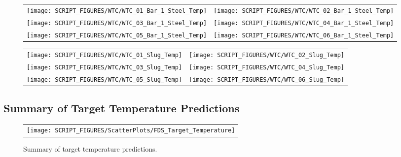 \begin{figure}[p]
\begin{tabular*}{\textwidth}{l@{\extracolsep{\fill}}r}
\texttt{[image: SCRIPT\_FIGURES/WTC/WTC\_01\_Bar\_1\_Steel\_Temp]} &
\texttt{[image: SCRIPT\_FIGURES/WTC/WTC\_02\_Bar\_1\_Steel\_Temp]} \\
\texttt{[image: SCRIPT\_FIGURES/WTC/WTC\_03\_Bar\_1\_Steel\_Temp]} &
\texttt{[image: SCRIPT\_FIGURES/WTC/WTC\_04\_Bar\_1\_Steel\_Temp]} \\
\texttt{[image: SCRIPT\_FIGURES/WTC/WTC\_05\_Bar\_1\_Steel\_Temp]} &
\texttt{[image: SCRIPT\_FIGURES/WTC/WTC\_06\_Bar\_1\_Steel\_Temp]}
\end{tabular*}
\label{NIST_WTC_Bar_1_Steel_Temp}
\end{figure}


\begin{figure}[p]
\begin{tabular*}{\textwidth}{l@{\extracolsep{\fill}}r}
\texttt{[image: SCRIPT\_FIGURES/WTC/WTC\_01\_Slug\_Temp]} &
\texttt{[image: SCRIPT\_FIGURES/WTC/WTC\_02\_Slug\_Temp]} \\
\texttt{[image: SCRIPT\_FIGURES/WTC/WTC\_03\_Slug\_Temp]} &
\texttt{[image: SCRIPT\_FIGURES/WTC/WTC\_04\_Slug\_Temp]} \\
\texttt{[image: SCRIPT\_FIGURES/WTC/WTC\_05\_Slug\_Temp]} &
\texttt{[image: SCRIPT\_FIGURES/WTC/WTC\_06\_Slug\_Temp]}
\end{tabular*}
\label{NIST_WTC_Slug_Temp}
\end{figure}

\clearpage

\subsection{Summary of Target Temperature Predictions}
\label{Target Temperature}


\begin{figure}[h!]
\begin{center}
\begin{tabular}{c}
\texttt{[image: SCRIPT\_FIGURES/ScatterPlots/FDS\_Target\_Temperature]}
\end{tabular}
\end{center}
\caption[Summary of target temperature predictions]
{Summary of target temperature predictions.}
\end{figure}

\clearpage


